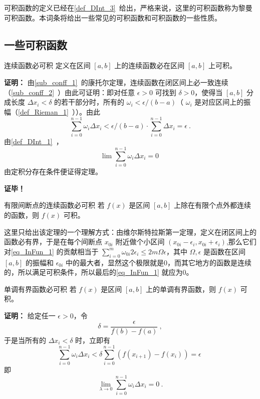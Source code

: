 
\begin{issues}
\end{issues}

可积函数的定义已经在\autoref{def_DInt_3}~给出，严格来说，这里的可积函数称为黎曼可积函数。本词条将给出一些常见的可积函数和可积函数的一些性质。
\subsection{一些可积函数}
\begin{theorem}{连续函数必可积}
定义在区间 $[a,b]$ 上的连续函数必在区间 $[a,b]$ 上可积。
\end{theorem}
\textbf{证明：}
由\autoref{sub_conff_1}~的康托尔定理，连续函数在闭区间上必一致连续（\autoref{sub_conff_2}~）由此可证明：即对任意 $\epsilon>0$ 可找到 $\delta>0$，使得当 $[a,b]$ 分成长度 $\Delta x_i<\delta$ 的若干部分时，所有的 $\omega_i<\epsilon/(b-a)$（ $\omega_i$ 是对应区间上的振幅（\autoref{def_Rieman_1}~））。由此
\begin{equation}
\sum_{i=0}^{n-1}\omega_i\Delta x_i<\epsilon/(b-a)\cdot\sum_{i=0}^{n-1}\Delta x_i=\epsilon~.
\end{equation}
由\autoref{def_DInt_1}~，
\begin{equation}\label{eq_InFun_1}
\lim\sum_{i=0}^{n-1}\omega_i\Delta x_i=0~
\end{equation}
由定积分存在条件便证得定理。

\textbf{证毕！}

\begin{theorem}{有限间断点的连续函数必可积}
若 $f(x)$ 是区间 $[a,b]$ 上除在有限个点外都连续的函数，则 $f(x)$ 可积。
\end{theorem}
这里只给出该定理的一个理解方式：由维尔斯特拉斯第一定理，定义在闭区间上的函数必有界，于是在每个间断点 $x_{0i}$ 附近做个小区间 $(x_{0i}-\epsilon_i,x_{0i}+\epsilon_i)$,那么它们对\autoref{eq_InFun_1} 的贡献相当于 $\sum_{i=0}^{m}\omega_{0i}2\epsilon_i\leq2m\Omega\epsilon $，其中 $\Omega,\epsilon$ 是函数在区间 $[a,b]$ 的振幅和 $\epsilon_{0i}$ 中的最大者，显然这个极限就是0，而其它地方的函数是连续的，所以满足可积条件，所以最后的\autoref{eq_InFun_1} 就应为0。 

\begin{theorem}{单调有界函数必可积}
若 $f(x)$ 是区间 $[a,b]$ 上的单调有界函数，则 $f(x)$ 可积。
\end{theorem}
\textbf{证明：}
给定任一 $\epsilon>0$，令 
\begin{equation}
\delta=\frac{\epsilon}{f(b)-f(a)}~,
\end{equation}
于是当所有的 $\Delta x_i<\delta$ 时，立即有
\begin{equation}
\sum_{i=0}^{n-1}\omega_i\Delta x_i<\delta\sum_{i=0}^{n-1}(f(x_{i+1})-f(x_i))=\epsilon~
\end{equation}
即 
\begin{equation}
\lim_{\lambda\rightarrow0}\sum_{i=0}^{n-1}\omega_i\Delta x_i=0~.
\end{equation}


